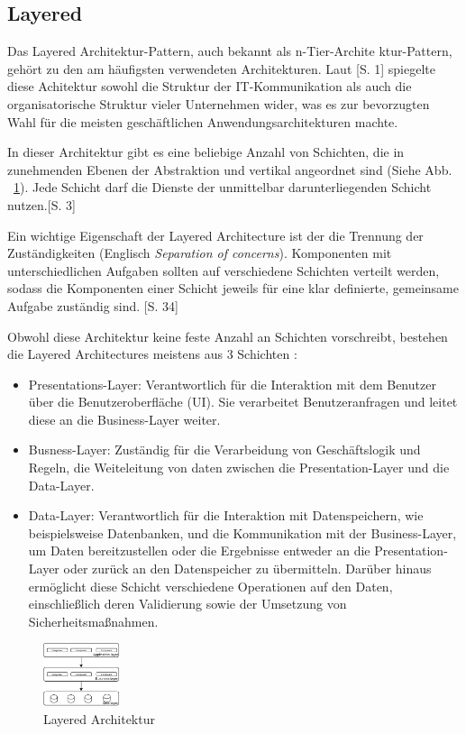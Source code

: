 \documentclass[acmtog]{acmart}
\begin{document}
\subsection{Layered}
Das Layered Architektur-Pattern, auch bekannt als n-Tier-Archite
ktur-Pattern, gehört zu den am häufigsten verwendeten Architekturen. Laut \cite{layered}[S. 1] 
spiegelte diese Achitektur sowohl die Struktur der IT-Kommunikation als auch die organisatorische Struktur vieler Unternehmen wider,
was es zur bevorzugten Wahl für die meisten geschäftlichen Anwendungsarchitekturen machte. 

In dieser Architektur gibt es eine beliebige Anzahl von Schichten, die in zunehmenden Ebenen 
der Abstraktion und vertikal angeordnet sind (Siehe Abb. ~\ref{fig:layered}). 
Jede Schicht darf die Dienste der unmittelbar darunterliegenden Schicht nutzen.\cite{layered3}[S. 3]

Ein wichtige Eigenschaft der Layered Architecture ist der die Trennung der Zuständigkeiten 
(Englisch \textit{Separation of concerns}). Komponenten mit unterschiedlichen Aufgaben sollten 
auf verschiedene Schichten verteilt werden, sodass die Komponenten einer Schicht jeweils für 
eine klar definierte, gemeinsame Aufgabe zuständig sind. \cite {layered2}[S. 34]

Obwohl diese Architektur keine feste Anzahl an Schichten vorschreibt, 
bestehen die Layered Architectures meistens aus 3 Schichten \cite {layered2}:
\begin{itemize}
\item Presentations-Layer: Verantwortlich für die Interaktion mit dem Benutzer über die Benutzeroberfläche (UI). 
  Sie verarbeitet Benutzeranfragen und leitet diese an die Business-Layer weiter.
\item Busness-Layer: Zuständig für die Verarbeidung von Geschäftslogik und Regeln, die Weiteleitung von daten zwischen 
  die Presentation-Layer und die Data-Layer.
\item Data-Layer: Verantwortlich für die Interaktion mit Datenspeichern, wie beispielsweise Datenbanken,
  und die Kommunikation mit der Business-Layer, um Daten bereitzustellen oder die Ergebnisse entweder an die Presentation-Layer
  oder zurück an den Datenspeicher zu übermitteln. Darüber hinaus ermöglicht diese Schicht verschiedene Operationen auf den Daten,
  einschließlich deren Validierung sowie der Umsetzung von Sicherheitsmaßnahmen.
\end{itemize}

\begin{figure}[h!]
    \centering
    \includegraphics[width=0.2\textwidth]{images/layer.pdf}
    \caption{Layered Architektur}
    \label{fig:layered}
\end{figure}
\end{document}

